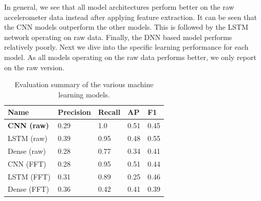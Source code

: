 In general, we see that all model architectures perform better on the raw accelerometer data instead after applying feature extraction. It can be seen that the CNN models outperform the other models. This is followed by the LSTM network operating on raw data. Finally, the DNN based model performs relatively poorly. Next we dive into the specific learning performance for each model. As all models operating on the raw data performs better, we only report on the raw version.


\begin{table}[ht]
\centering
\begin{tabular}{|l|l|l|l|l|}
\hline
\textbf{Name} & \textbf{Precision} & \textbf{Recall} & \textbf{AP} & \textbf{F1} \\ \hline
\textbf{CNN (raw)}      & 0.29               & 1.0             & 0.51        & 0.45        \\ \hline
LSTM (raw)     & 0.39               & 0.95            & 0.48        & 0.55        \\ \hline
Dense (raw)    & 0.28               & 0.77            & 0.34        & 0.41        \\ \hline
CNN (FFT)      & 0.28               & 0.95            & 0.51        & 0.44        \\ \hline
LSTM (FFT)     & 0.31               & 0.89            & 0.25        & 0.46        \\ \hline
Dense (FFT)    & 0.36               & 0.42            & 0.41        & 0.39        \\ \hline
\end{tabular}
\captionsetup{width=.90\textwidth}
\caption{Evaluation summary of the various machine learning models.}
\label{tab:results-acc}
\end{table}


